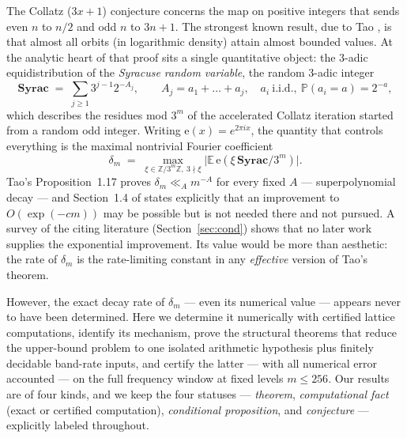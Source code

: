 \documentclass[11pt]{article}
\theoremstyle{definition}
\newcommand{\Z}{\mathbb{Z}}
\newcommand{\E}{\mathbb{E}}
\newcommand{\Prob}{\mathbb{P}}
\newcommand{\e}{\mathrm{e}}
\begin{document}
The Collatz ($3x+1$) conjecture concerns the map on positive integers that
sends even $n$ to $n/2$ and odd $n$ to $3n+1$. The strongest known result,
due to Tao \cite{Tao2022}, is that almost all orbits (in logarithmic
density) attain almost bounded values. At the analytic heart of that proof
sits a single quantitative object: the $3$-adic equidistribution of the
\emph{Syracuse random variable}, the random $3$-adic integer
\[
\mathbf{Syrac}\;=\;\sum_{j\ge 1} 3^{j-1}2^{-A_j},\qquad
A_j=a_1+\dots+a_j,\quad a_i\ \text{i.i.d.},\ \Prob(a_i=a)=2^{-a},
\]
which describes the residues mod $3^m$ of the accelerated Collatz
iteration started from a random odd integer. Writing
$\e(x)=e^{2\pi i x}$, the quantity that controls everything is the maximal
nontrivial Fourier coefficient
\[
\delta_m\;=\;\max_{\xi\in\Z/3^m\Z,\ 3\nmid \xi}
\bigl|\E\,\e(\xi\,\mathbf{Syrac}/3^m)\bigr|.
\]
Tao's Proposition~1.17 proves $\delta_m\ll_A m^{-A}$ for every fixed $A$
--- superpolynomial decay --- and Section~1.4 of \cite{Tao2022} states
explicitly that an improvement to $O(\exp(-cm))$ may be possible but is
not needed there and not pursued. A survey of the citing literature
(Section~\ref{sec:cond}) shows that no later work supplies the
exponential improvement. Its value would be more than aesthetic: the rate
of $\delta_m$ is the rate-limiting constant in any \emph{effective}
version of Tao's theorem.

However, the exact decay rate of $\delta_m$ --- even its numerical value
--- appears never to have been determined. Here we determine it
numerically with certified lattice computations, identify its mechanism,
prove the structural theorems that reduce the upper-bound problem to one
isolated arithmetic hypothesis plus finitely decidable band-rate inputs,
and certify the latter --- with all numerical error accounted --- on the
full frequency window at fixed levels $m\le 256$. Our results are of four
kinds, and we keep the four statuses --- \emph{theorem},
\emph{computational fact} (exact or certified computation),
\emph{conditional proposition}, and \emph{conjecture} --- explicitly labeled
throughout.
\end{document}
